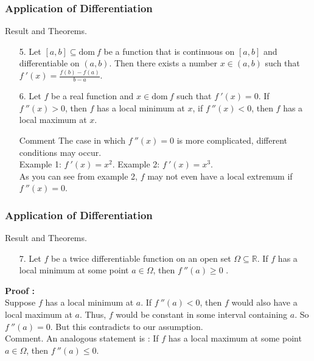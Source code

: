 \documentclass{beamer}
\begin{document}
\begin{frame}
    \frametitle{Application of Differentiation}
Result and Theorems.\\
\begin{enumerate}
    \item[5.] Let $[a,b]\subseteq\text{dom}\ f$ be a function that is continuous on $[a,b]$ and differentiable on $(a,b)$.
        Then there exists a number $x\in(a,b)$ such that $f~'(x)=\frac{f(b)-f(a)}{b-a}$.
    \vspace{0.5em}
    \item[6.] Let $f$ be a real function and $x\in \text{dom}\ f$ such that $f~'(x)=0$. If $f~''(x)>0$, then $f$ has a local minimum at $x$, 
        if $f~''(x)<0$, then $f$ has a local maximum at $x$.\\
    \vspace{0.3em}
    \begin{block}{Comment}
        The case in which $f~''(x)=0$ is more complicated, different conditions may occur.\\
        \hspace{1em}Example 1: $f~'(x)=x^2$.    
        \hspace{1em}Example 2: $f~'(x)=x^3$.\\
        As you can see from example 2, $f$ may not even have a local extremum if $f~''(x)=0$.
    \end{block}
  
\end{enumerate}


\end{frame}


\begin{frame}
    \frametitle{Application of Differentiation}
Result and Theorems.\\
\begin{enumerate}
    \item[7.] Let $f$ be a twice differentiable function on an open set $\Omega\subseteq \mathbb{R}$. 
        If $f$ has a local minimum at some point $a\in \Omega$, then $f~''(a)\geq 0$ .
\end{enumerate}
\textbf{Proof : }\\
\hspace{1em} Suppose $f$ has a local minimum at $a$. If $f~''(a)<0$, then $f$ would also have a local maximum at $a$. 
Thus, $f$ would be constant in some interval containing $a$. So $f~''(a)=0$. But this contradicts to our assumption.\\
\vspace{2em}
Comment. An analogous statement is : If $f$ has a local maximum at some point $a\in\Omega$, then $f~''(a)\leq 0$.

\end{frame}
\end{document}
